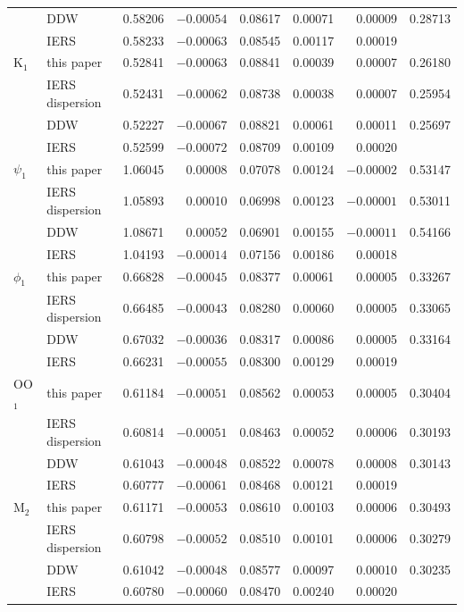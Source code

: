 \begin{table}
\begin{tabular*}{\textwidth}{@{\extracolsep{\fill}}llrrrrrr@{}}
 & DDW & 0.58206 & $-0.00054$ & 0.08617 & 0.00071 & 0.00009 & 0.28713 \\
 & IERS & 0.58233 & $-0.00063$ & 0.08545 & 0.00117 & 0.00019 &  \\
\addlinespace[2pt]
K$_1$ & this paper & 0.52841 & $-0.00063$ & 0.08841 & 0.00039 & 0.00007 & 0.26180 \\
 & IERS dispersion & 0.52431 & $-0.00062$ & 0.08738 & 0.00038 & 0.00007 & 0.25954 \\
 & DDW & 0.52227 & $-0.00067$ & 0.08821 & 0.00061 & 0.00011 & 0.25697 \\
 & IERS & 0.52599 & $-0.00072$ & 0.08709 & 0.00109 & 0.00020 &  \\
\addlinespace[2pt]
$\psi_1$ & this paper & 1.06045 & 0.00008 & 0.07078 & 0.00124 & $-0.00002$ & 0.53147 \\
 & IERS dispersion & 1.05893 & 0.00010 & 0.06998 & 0.00123 & $-0.00001$ & 0.53011 \\
 & DDW & 1.08671 & 0.00052 & 0.06901 & 0.00155 & $-0.00011$ & 0.54166 \\
 & IERS & 1.04193 & $-0.00014$ & 0.07156 & 0.00186 & 0.00018 &  \\
\addlinespace[2pt]
$\phi_1$ & this paper & 0.66828 & $-0.00045$ & 0.08377 & 0.00061 & 0.00005 & 0.33267 \\
 & IERS dispersion & 0.66485 & $-0.00043$ & 0.08280 & 0.00060 & 0.00005 & 0.33065 \\
 & DDW & 0.67032 & $-0.00036$ & 0.08317 & 0.00086 & 0.00005 & 0.33164 \\
 & IERS & 0.66231 & $-0.00055$ & 0.08300 & 0.00129 & 0.00019 &  \\
\addlinespace[2pt]
OO$_1$ & this paper & 0.61184 & $-0.00051$ & 0.08562 & 0.00053 & 0.00005 & 0.30404 \\
 & IERS dispersion & 0.60814 & $-0.00051$ & 0.08463 & 0.00052 & 0.00006 & 0.30193 \\
 & DDW & 0.61043 & $-0.00048$ & 0.08522 & 0.00078 & 0.00008 & 0.30143 \\
 & IERS & 0.60777 & $-0.00061$ & 0.08468 & 0.00121 & 0.00019 &  \\
\addlinespace[2pt]
M$_2$ & this paper & 0.61171 & $-0.00053$ & 0.08610 & 0.00103 & 0.00006 & 0.30493 \\
 & IERS dispersion & 0.60798 & $-0.00052$ & 0.08510 & 0.00101 & 0.00006 & 0.30279 \\
 & DDW & 0.61042 & $-0.00048$ & 0.08577 & 0.00097 & 0.00010 & 0.30235 \\
 & IERS & 0.60780 & $-0.00060$ & 0.08470 & 0.00240 & 0.00020 &  \\
\bottomrule
\end{tabular*}
\end{table}

